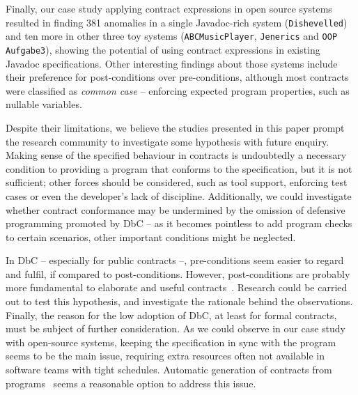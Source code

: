 Finally, our case study applying contract expressions in open source systems resulted in finding 381 anomalies in a single Javadoc-rich system (\texttt{Dishevelled}) and ten more in other three toy systems (\texttt{ABCMusicPlayer}, \texttt{Jenerics} and \texttt{OOP Aufgabe3}), showing the potential of using contract expressions in existing Javadoc specifications.
Other interesting findings about those systems include their preference for post-conditions over pre-conditions, although most contracts were classified as \emph{common case} -- enforcing expected program properties, such as nullable variables.

Despite their limitations, we believe the studies presented in this paper prompt the research community to investigate some hypothesis with future enquiry. 
Making sense of the specified behaviour in contracts is undoubtedly a necessary condition to providing a program that conforms to the specification, but it is not sufficient; other forces should be considered, such as tool support, enforcing test cases or even the developer's lack of discipline.  
Additionally, we could investigate whether contract conformance may be undermined by the omission of defensive programming promoted by DbC -- as it becomes pointless to add program checks to certain scenarios, other important conditions might be neglected. 


In DbC -- especially for public contracts --, pre-conditions seem easier to regard and fulfil, if compared to post-conditions. However, post-conditions are probably more fundamental to elaborate and useful contracts~\cite{Rosenblum}. Research could be carried out to test this hypothesis, and investigate the rationale behind the observations.   
Finally, the reason for the low adoption of DbC, at least for formal contracts, must be subject of further consideration. As we could observe in our case study with open-source systems, keeping the specification in sync with the program seems to be the main issue, requiring extra resources often not available in software teams with tight schedules. Automatic generation of contracts from programs~\cite{docAnalysis,atComment} seems a reasonable option to address this issue.  


